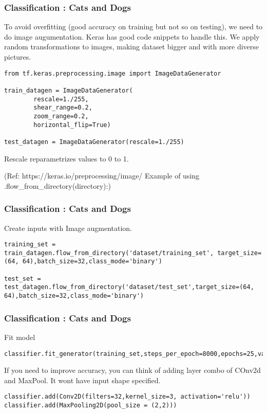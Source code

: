 \begin{frame}[fragile] \frametitle{Classification : Cats and Dogs}
To avoid overfitting (good accuracy on training but not so on testing), we need to do image augumentation.
Keras has good code snippets to handle this. We apply random transformations to images, making dataset bigger and with more diverse pictures.
\begin{lstlisting}
from tf.keras.preprocessing.image import ImageDataGenerator

train_datagen = ImageDataGenerator(
        rescale=1./255,
        shear_range=0.2,
        zoom_range=0.2,
        horizontal_flip=True)

test_datagen = ImageDataGenerator(rescale=1./255)
\end{lstlisting}
Rescale reparametrizes values to 0 to 1.


(Ref: https://keras.io/preprocessing/image/   Example of using .flow\_from\_directory(directory):)
\end{frame}

\begin{frame}[fragile] \frametitle{Classification : Cats and Dogs}
Create inputs with Image augmentation.
\begin{lstlisting}
training_set = train_datagen.flow_from_directory('dataset/training_set', target_size=(64, 64),batch_size=32,class_mode='binary')

test_set = test_datagen.flow_from_directory('dataset/test_set',target_size=(64, 64),batch_size=32,class_mode='binary')

\end{lstlisting}

\end{frame}


\begin{frame}[fragile] \frametitle{Classification : Cats and Dogs}
Fit model
\begin{lstlisting}
classifier.fit_generator(training_set,steps_per_epoch=8000,epochs=25,validation_data=test_set,validation_steps=2000)
\end{lstlisting}
If you need to improve accuracy, you can think of adding layer combo of COnv2d and MaxPool. It wont have input shape specified.
\begin{lstlisting}
classifier.add(Conv2D(filters=32,kernel_size=3, activation='relu'))
classifier.add(MaxPooling2D(pool_size = (2,2)))
\end{lstlisting}

\end{frame}

